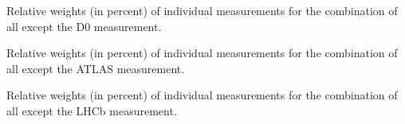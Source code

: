 \begin{table}[!tbp]
  \centering
  
  \caption{Relative weights (in percent) of individual measurements 
    for the combination of all except the D0 measurement.}
\label{tbl:wgtallexcd0}
\end{table}

\begin{table}[!tbp]
  \centering
  
  \caption{Relative weights (in percent) of individual measurements 
    for the combination of all except the ATLAS measurement.}
\label{tbl:wgtallexcatlas}
\end{table}

\begin{table}[!tbp]
  \centering
  
  \caption{Relative weights (in percent) of individual measurements 
    for the combination of all except the LHCb measurement.}
\label{tbl:wgtallexclhcb}
\end{table}
